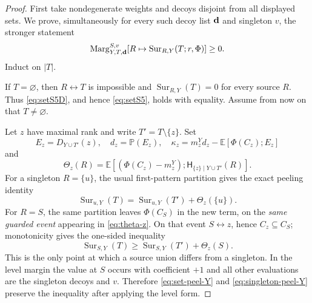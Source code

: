 \documentclass[11pt]{article}
\theoremstyle{definition}
\theoremstyle{remark}
\newcommand{\PP}{\mathbb P}
\newcommand{\EE}{\mathbb E}
\newcommand{\Sur}{\operatorname{Sur}}
\newcommand{\con}{\leftrightarrow}
\begin{document}
\begin{proof}
First take nondegenerate weights and decoys disjoint from all displayed
sets.  We prove, simultaneously for every such decoy list ${\bf d}$ and
singleton $v$, the stronger statement
\begin{equation}\label{eq:setS5D}
 \operatorname{Marg}_{Y,T,{\bf d}}^{S,v}
       [R\mapsto\Sur_{R,Y}(T;r,\Phi)]\geq0.
\end{equation}
Induct on $|T|$.

If $T=\varnothing$, then $R\con T$ is impossible and
$\Sur_{R,Y}(T)=0$ for every source $R$.  Thus
\eqref{eq:setS5D}, and hence \eqref{eq:setS5}, holds with equality.
Assume from now on that $T\ne\varnothing$.

Let $z$ have maximal rank and write $T'=T\setminus\{z\}$.  Set
\[
 E_z=D_{Y\cup T'}(z),\quad d_z=\PP(E_z),\quad
 \kappa_z=m_z^Y d_z-\EE[\Phi(C_z);E_z]
\]
and
\begin{equation}\label{eq:theta-z}
 \Theta_z(R)=\EE[(\Phi(C_z)-m_z^Y);
                    \mathsf H_{\{z\}\mid Y\cup T'}(R)].
\end{equation}
For a singleton $R=\{u\}$, the usual first-pattern partition gives the
exact peeling identity
\begin{equation}\label{eq:singleton-peel-Y}
 \Sur_{u,Y}(T)=\Sur_{u,Y}(T')+\Theta_z(\{u\}).
\end{equation}
For $R=S$, the same partition leaves
$\Phi(C_S)$ in the new term, on the \emph{same guarded event} appearing
in \eqref{eq:theta-z}.  On that event $S\con z$, hence
$C_z\subseteq C_S$; monotonicity gives the one-sided inequality
\begin{equation}\label{eq:set-peel-Y}
 \Sur_{S,Y}(T)\geq\Sur_{S,Y}(T')+\Theta_z(S).
\end{equation}
This is the only point at which a source union differs from a singleton.
In the level margin the value at $S$ occurs with coefficient $+1$ and
all other evaluations are the singleton decoys and $v$.  Therefore
\eqref{eq:set-peel-Y} and \eqref{eq:singleton-peel-Y} preserve the
inequality after applying the level form.


\end{proof}
\end{document}
